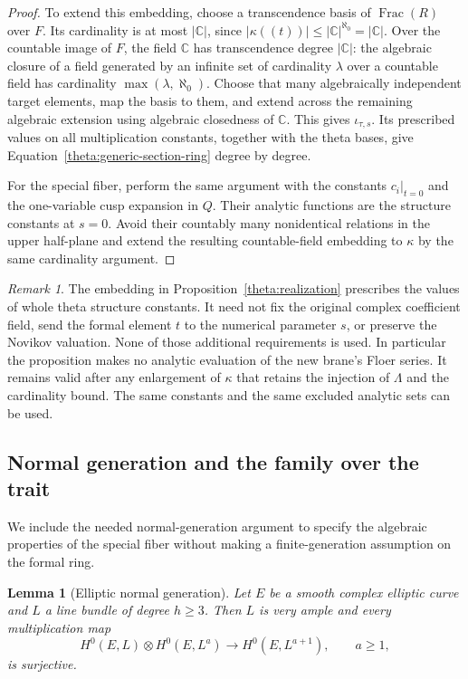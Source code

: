 \documentclass[11pt]{article}
\newtheorem{lemma}[theorem]{Lemma}
\theoremstyle{definition}
\theoremstyle{remark}
\newtheorem{remark}[theorem]{Remark}
\newcommand{\C}{\mathbb C}
\numberwithin{equation}{section}
\begin{document}
\begin{proof}
To extend this embedding, choose a transcendence basis of
$\operatorname{Frac}(R)$ over $F$.  Its cardinality is at most
$|\C|$, since
$|\kappa((t))|\leq|\C|^{\aleph_0}=|\C|$.
Over the countable image of $F$, the field $\C$ has transcendence degree
$|\C|$: the algebraic closure of a field generated by an infinite set of
cardinality $\lambda$ over a countable field has cardinality
$\max(\lambda,\aleph_0)$.  Choose that many algebraically independent
target elements, map the basis to them, and extend across the remaining
algebraic extension using algebraic closedness of $\C$.  This gives
$\iota_{\tau,s}$.  Its prescribed values on all multiplication constants,
together with the theta bases, give
Equation~\eqref{theta:generic-section-ring} degree by degree.

For the special fiber, perform the same argument with the constants
$c_i|_{t=0}$ and the one-variable cusp expansion in $Q$.
Their analytic functions are the structure constants at $s=0$.
Avoid their countably many nonidentical relations in the upper half-plane
and extend the resulting countable-field embedding to $\kappa$ by the
same cardinality argument.
\end{proof}

\begin{remark}\label{theta:abstract-embedding}
The embedding in Proposition~\ref{theta:realization} prescribes the values
of whole theta structure constants.  It need not fix the original complex
coefficient field, send the formal element $t$ to the numerical parameter
$s$, or preserve the Novikov valuation.  None of those additional
requirements is used.  In particular the proposition makes no analytic
evaluation of the new brane's Floer series.  It remains valid after any
enlargement of $\kappa$ that retains the injection of $\Lambda$ and the
cardinality bound.  The same constants and the same excluded analytic
sets can be used.
\end{remark}

\subsection{Normal generation and the family over the trait}

We include the needed normal-generation argument to specify the algebraic
properties of the special fiber without making a finite-generation
assumption on the formal ring.

\begin{lemma}[Elliptic normal generation]\label{theta:elliptic-generation}
Let $E$ be a smooth complex elliptic curve and $L$ a line bundle of degree
$h\geq3$.  Then $L$ is very ample and every multiplication map
\[
 H^0(E,L)\otimes H^0(E,L^a)\longrightarrow H^0(E,L^{a+1}),
 \qquad a\geq1,
\]
is surjective.
\end{lemma}
\end{document}
